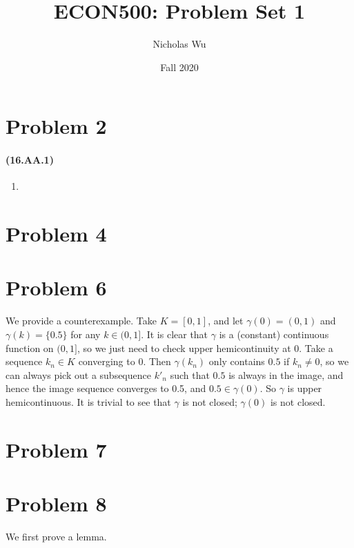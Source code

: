 \documentclass[10pt,letter]{article}
\begin{document}


\title{ECON500: Problem Set 1}

\author{Nicholas Wu}

\date{Fall 2020}

\maketitle


\section*{Problem 2}
\paragraph{(16.AA.1)}
\begin{enumerate}[label=(\alph*)]
\item
\end{enumerate}
\section*{Problem 4}
\section*{Problem 6}
We provide a counterexample. Take $K = [0,1]$, and let $\gamma(0) = (0,1)$ and $\gamma(k) = \{ 0.5 \} $ for any $k \in (0, 1]$. It is clear that $\gamma$ is a (constant) continuous function on $(0,1]$, so we just need to check upper hemicontinuity at 0. Take a sequence $k_n \in K$ converging to 0. Then $\gamma(k_n)$ only contains $0.5$ if $k_n \neq 0$, so we can always pick out a subsequence $k'_n$ such that $0.5$ is always in the image, and hence the image sequence converges to 0.5, and $0.5 \in \gamma(0)$. So $\gamma$ is upper hemicontinuous. It is trivial to see that $\gamma$ is not closed; $\gamma(0)$ is not closed.
\section*{Problem 7}
\section*{Problem 8}
We first prove a lemma.
\end{document}
